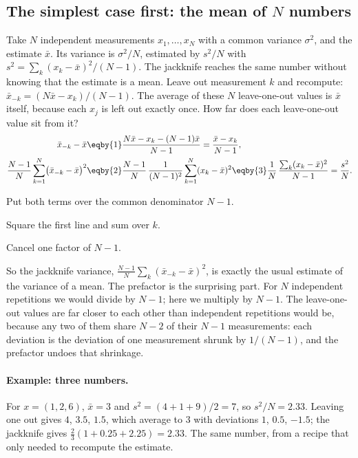 \subsection{The simplest case first: the mean of \texorpdfstring{$N$}{N} numbers}
\label{13c:sec:jk-mean}

Take $N$ independent measurements $x_1,\dots,x_N$ with a common variance $\sigma^2$,
and the estimate $\bar x$. Its variance is $\sigma^2/N$, estimated by $s^2/N$ with
$s^2=\sum_k(x_k-\bar x)^2/(N-1)$. The jackknife reaches the same number without
knowing that the estimate is a mean. Leave out measurement $k$ and recompute:
$\bar x_{-k}=(N\bar x-x_k)/(N-1)$. The average of these $N$ leave-one-out values is
$\bar x$ itself, because each $x_j$ is left out exactly once. How far does each
leave-one-out value sit from it?
\begin{align}
  \bar x_{-k}-\bar x
  &\eqby{1}\frac{N\bar x-x_k-(N-1)\bar x}{N-1}
   =\frac{\bar x-x_k}{N-1},
  \nonumber\\
  \frac{N-1}{N}\sum_{k=1}^N\bigl(\bar x_{-k}-\bar x\bigr)^2
  &\eqby{2}\frac{N-1}{N}\,\frac{1}{(N-1)^2}\sum_{k=1}^N(x_k-\bar x)^2
   \eqby{3}\frac{1}{N}\,\frac{\sum_k(x_k-\bar x)^2}{N-1}
   =\frac{s^2}{N}.
  \label{13c:eq:jk-mean}
\end{align}
\begin{explain}
  \item Put both terms over the common denominator $N-1$.
  \item Square the first line and sum over $k$.
  \item Cancel one factor of $N-1$.
\end{explain}
So the jackknife variance, $\frac{N-1}{N}\sum_k(\bar x_{-k}-\bar x)^2$, is exactly the
usual estimate of the variance of a mean. The prefactor is the surprising part.
For $N$ independent repetitions we would divide by $N-1$; here we multiply by $N-1$.
The leave-one-out values are far closer to each other than independent repetitions
would be, because any two of them share $N-2$ of their $N-1$ measurements: each
deviation is the deviation of one measurement shrunk by $1/(N-1)$, and the prefactor
undoes that shrinkage.

\paragraph{Example: three numbers.}
For $x=(1,2,6)$, $\bar x=3$ and $s^2=(4+1+9)/2=7$, so $s^2/N=2.33$. Leaving one out
gives $4$, $3.5$, $1.5$, which average to $3$ with deviations $1$, $0.5$, $-1.5$; the
jackknife gives $\frac23(1+0.25+2.25)=2.33$. The same number, from a recipe that only
needed to recompute the estimate.

